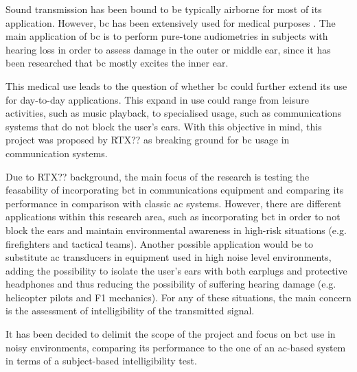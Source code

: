 Sound transmission has been bound to be typically airborne for most of its application. However, \gls{bc} has been extensively used for medical purposes \citep{iso_389-3}. The main application of \gls{bc} is to perform pure-tone audiometries in subjects with hearing loss in order to assess damage in the outer or middle ear, since it has been researched that \gls{bc} mostly excites the inner ear.

This medical use leads to the question of whether \gls{bc} could further extend its use for day-to-day applications. This expand in use could range from leisure activities, such as music playback, to specialised usage, such as communications systems that do not block the user's ears. With this objective in mind, this project was proposed by RTX?? as breaking ground for \gls{bc} usage in communication systems.

Due to RTX?? background, the main focus of the research is testing the feasability of incorporating \gls{bct} in communications equipment and comparing its performance in comparison with classic \gls{ac} systems. However, there are different applications within this research area, such as incorporating \gls{bct} in order to not block the ears and maintain environmental awareness in high-risk situations (e.g. firefighters and tactical teams). Another possible application would be to substitute \gls{ac} transducers in equipment used in high noise level environments, adding the possibility to isolate the user's ears with both earplugs and protective headphones and thus reducing the possibility of suffering hearing damage (e.g. helicopter pilots and F1 mechanics). For any of these situations, the main concern is the assessment of intelligibility of the transmitted signal.

It has been decided to delimit the scope of the project and focus on \gls{bct} use in noisy environments, comparing its performance to the one of an \gls{ac}-based system in terms of a subject-based intelligibility test.